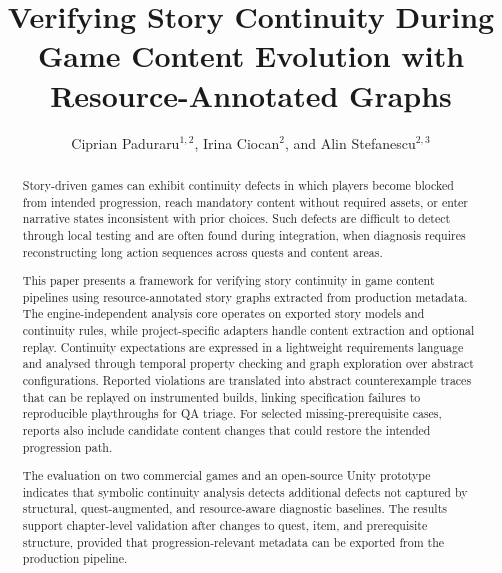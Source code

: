 \documentclass[conference]{IEEEtran}
\begin{document}
\title{Verifying Story Continuity During Game Content Evolution with Resource-Annotated Graphs}

\author{Ciprian Paduraru$^{1,2}$, Irina Ciocan$^2$, and Alin Stefanescu$^{2,3}$
\\
}

\maketitle

\begin{abstract}
Story-driven games can exhibit continuity defects in which players become
blocked from intended progression, reach mandatory content without required
assets, or enter narrative states inconsistent with prior choices. Such
defects are difficult to detect through local testing and are often found
during integration, when diagnosis requires reconstructing long action
sequences across quests and content areas.

This paper presents a framework for verifying story continuity in game
content pipelines using resource-annotated story graphs extracted from
production metadata. The engine-independent analysis core operates on
exported story models and continuity rules, while project-specific
adapters handle content extraction and optional replay. Continuity
expectations are expressed in a lightweight requirements language and
analysed through temporal property checking and graph exploration over
abstract configurations. Reported violations are translated into abstract counterexample traces
that can be replayed on instrumented builds, linking specification
failures to reproducible playthroughs for QA triage. For selected missing-prerequisite cases,
reports also include candidate content changes that could restore the
intended progression path.

The evaluation on two commercial games and an open-source Unity prototype
indicates that symbolic continuity analysis detects additional defects not
captured by structural, quest-augmented, and resource-aware diagnostic
baselines. The results support chapter-level validation after changes to quest,
item, and prerequisite structure, provided that progression-relevant
metadata can be exported from the production pipeline.
\end{abstract}
\end{document}
